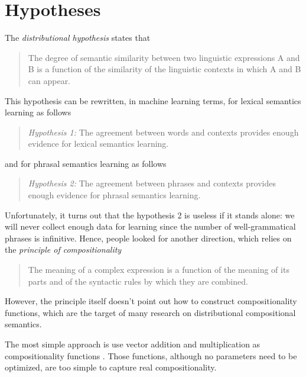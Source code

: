 \documentclass[10pt]{article}
\begin{document}
\section{Hypotheses}
\label{section hypotheses}
The \textit{distributional hypothesis} states that \citep{lenci_distributional_2008}
\begin{quote}
The degree of semantic similarity between two linguistic expressions A and B is a function
of the similarity of the linguistic contexts in which A and B can appear. 
\end{quote}
This hypothesis can be rewritten, in machine learning terms, for lexical semantics learning as follows
\begin{quote}
\textit{Hypothesis 1:} The agreement between words and contexts provides enough 
evidence for lexical semantics learning.
\end{quote}
and for phrasal semantics learning as follows
\begin{quote}
\textit{Hypothesis 2:} The agreement between phrases and contexts provides enough evidence
for phrasal semantics learning.
\end{quote}

Unfortunately, it turns out that the hypothesis 2 is useless if it stands alone: we will never collect 
enough data for learning since the number of well-grammatical phrases is infinitive. Hence, 
people looked for another direction, which relies on the \textit{principle of compositionality} 
\citep{partee_lexical_1995}
\begin{quote}
The meaning of a complex expression is a function of the meaning of its parts and of the syntactic
rules by which they are combined. 
\end{quote}
However, the principle itself doesn't point out how to construct compositionality functions, 
which are the target of many research on distributional compositional semantics. 

The most simple approach is use vector addition and multiplication as compositionality functions
\citep{mitchell_vector-based_2008}. Those functions, although no parameters need to be optimized, 
are too simple to capture real compositionality. 
\end{document}
